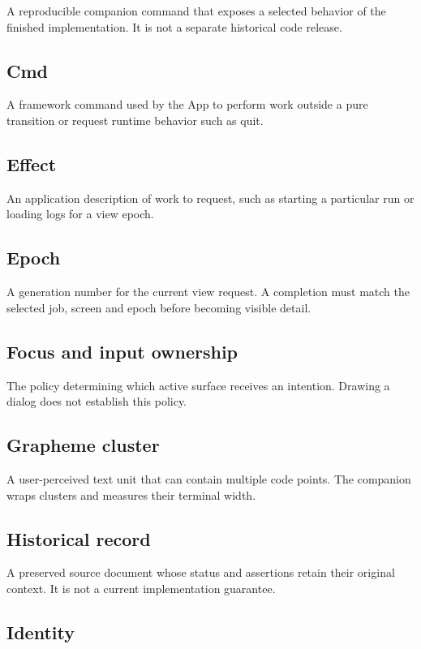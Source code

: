 A reproducible companion command that exposes a selected behavior of the finished implementation. It is not a separate historical code release.

\subsection{Cmd}

A framework command used by the App to perform work outside a pure transition or request runtime behavior such as quit.

\subsection{Effect}

An application description of work to request, such as starting a particular run or loading logs for a view epoch.

\subsection{Epoch}

A generation number for the current view request. A completion must match the selected job, screen and epoch before becoming visible detail.

\subsection{Focus and input ownership}

The policy determining which active surface receives an intention. Drawing a dialog does not establish this policy.

\subsection{Grapheme cluster}

A user-perceived text unit that can contain multiple code points. The companion wraps clusters and measures their terminal width.

\subsection{Historical record}

A preserved source document whose status and assertions retain their original context. It is not a current implementation guarantee.

\subsection{Identity}

